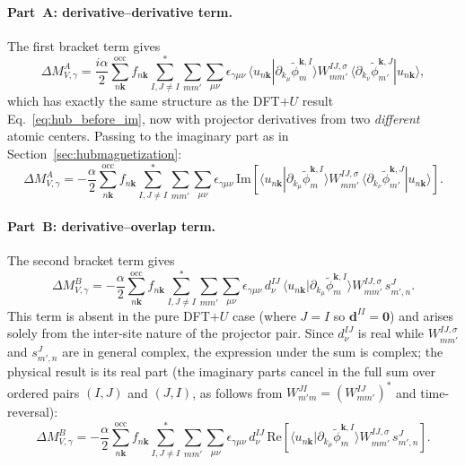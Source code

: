 \documentclass[11pt]{article}
\begin{document}
\paragraph{Part~A: derivative--derivative term.}
The first bracket term gives
\begin{equation}
  \Delta M_{V,\gamma}^{A}
  =
  \frac{i\alpha}{2}
  \sum_{n\mathbf{k}}^{\mathrm{occ}}f_{n\mathbf{k}}
  \sum_{I,J\ne I}^{*}\sum_{mm'}\sum_{\mu\nu}
  \epsilon_{\gamma\mu\nu}\,
  \langle u_{n\mathbf{k}}|\partial_{k_\mu}\widetilde\phi^{\mathbf{k},I}_{m}\rangle
  W_{mm'}^{IJ,\sigma}\,
  \langle\partial_{k_\nu}\widetilde\phi^{\mathbf{k},J}_{m'}|u_{n\mathbf{k}}\rangle,
  \label{eq:deltaM_VA}
\end{equation}
which has exactly the same structure as the DFT$+U$ result
Eq.~\eqref{eq:hub_before_im}, now with projector derivatives from two
\emph{different} atomic centers.  Passing to the imaginary part as in
Section~\ref{sec:hubmagnetization}:
\begin{equation}
  \Delta M_{V,\gamma}^{A}
  =
  -\frac{\alpha}{2}
  \sum_{n\mathbf{k}}^{\mathrm{occ}}f_{n\mathbf{k}}
  \sum_{I,J\ne I}^{*}\sum_{mm'}\sum_{\mu\nu}
  \epsilon_{\gamma\mu\nu}\,
  \mathrm{Im}\!\left[
    \langle u_{n\mathbf{k}}|\partial_{k_\mu}\widetilde\phi^{\mathbf{k},I}_{m}\rangle
    W_{mm'}^{IJ,\sigma}\,
    \langle\partial_{k_\nu}\widetilde\phi^{\mathbf{k},J}_{m'}|u_{n\mathbf{k}}\rangle
  \right].
  \label{eq:deltaM_VA_im}
\end{equation}

\paragraph{Part~B: derivative--overlap term.}
The second bracket term gives
\begin{equation}
  \Delta M_{V,\gamma}^{B}
  =
  -\frac{\alpha}{2}
  \sum_{n\mathbf{k}}^{\mathrm{occ}}f_{n\mathbf{k}}
  \sum_{I,J\ne I}^{*}\sum_{mm'}\sum_{\mu\nu}
  \epsilon_{\gamma\mu\nu}\,d^{IJ}_\nu\,
  \langle u_{n\mathbf{k}}|\partial_{k_\mu}\widetilde\phi^{\mathbf{k},I}_{m}\rangle
  W_{mm'}^{IJ,\sigma}\,
  s^{J}_{m',n}.
  \label{eq:deltaM_VB}
\end{equation}
This term is absent in the pure DFT$+U$ case (where $J=I$ so
$\mathbf{d}^{II}=\mathbf{0}$) and arises solely from the inter-site
nature of the projector pair. Since $d^{IJ}_\nu$ is real while
$W_{mm'}^{IJ,\sigma}$ and $s^J_{m',n}$ are in general complex, the
expression under the sum is complex; the physical result is its real
part (the imaginary parts cancel in the full sum over ordered pairs
$(I,J)$ and $(J,I)$, as follows from $W^{JI}_{m'm} = (W^{IJ}_{mm'})^*$
and time-reversal):
\begin{equation}
  \Delta M_{V,\gamma}^{B}
  =
  -\frac{\alpha}{2}
  \sum_{n\mathbf{k}}^{\mathrm{occ}}f_{n\mathbf{k}}
  \sum_{I,J\ne I}^{*}\sum_{mm'}\sum_{\mu\nu}
  \epsilon_{\gamma\mu\nu}\,d^{IJ}_\nu\,
  \mathrm{Re}\!\left[
    \langle u_{n\mathbf{k}}|\partial_{k_\mu}\widetilde\phi^{\mathbf{k},I}_{m}\rangle
    W_{mm'}^{IJ,\sigma}\,
    s^{J}_{m',n}
  \right].
  \label{eq:deltaM_VB_re}
\end{equation}
\end{document}
